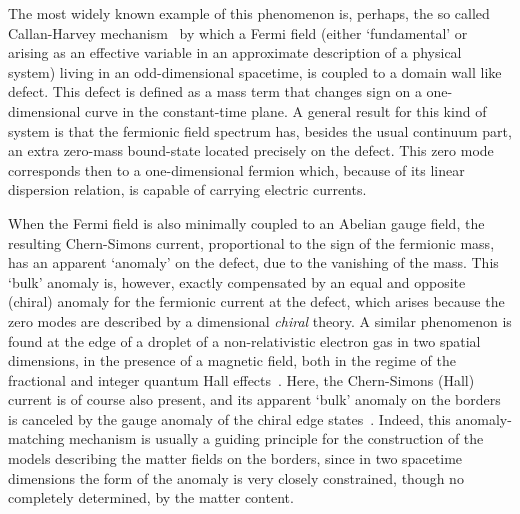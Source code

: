 \documentclass[a4paper,12pt]{article}
\begin{document}
The most widely known example of this phenomenon is, perhaps, the so
called Callan-Harvey mechanism~\cite{callan} by which a Fermi field
(either `fundamental' or arising as an effective variable in an
approximate description of a physical system) living in an
odd-dimensional spacetime, is coupled to a domain wall like defect.
This defect is defined as a mass term that changes sign on a
one-dimensional curve in the constant-time plane.  A general result
for this kind of system is that the fermionic field spectrum has,
besides the usual continuum part, an extra zero-mass bound-state
located precisely on the defect.  This zero mode corresponds then to a
one-dimensional fermion which, because of its linear dispersion
relation, is capable of carrying electric currents.

When the Fermi field is also minimally coupled to an Abelian gauge
field, the resulting Chern-Simons current, proportional to the
sign of the fermionic mass, has an apparent `anomaly' on the defect,
due to the vanishing of the mass. This `bulk' anomaly is, however,
exactly compensated by an equal and opposite (chiral) anomaly for the
fermionic current at the defect, which arises because the zero modes
are described by a \coordHE{} dimensional {\em chiral\/} theory.  A similar
phenomenon is found at the edge of a droplet of a non-relativistic
electron gas in two spatial dimensions, in the presence of a magnetic
field, both in the regime of the fractional and integer quantum Hall
effects~\cite{frad}.  Here, the Chern-Simons (Hall) current is of course also
present, and its apparent `bulk' anomaly on the borders is canceled by
the gauge anomaly of the chiral edge states~\cite{wen,haldane}.
Indeed, this anomaly-matching mechanism is usually a guiding
principle for the construction of the models describing the matter
fields on the borders, since in two spacetime dimensions the form of
the anomaly is very closely constrained, though no completely
determined, by the matter content.
\end{document}

